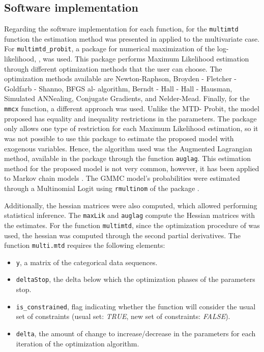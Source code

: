 \subsection{Software implementation}\label{software-implementation}

Regarding the software implementation for each function, for the \texttt{multimtd} function the estimation method was presented in \citet{Berchtold2001} applied to the multivariate case. For \texttt{multimtd\_probit}, a package for numerical maximization of the log-likelihood,  \citep{maxLik}, was used. This package performs Maximum Likelihood estimation through different optimization methods that the user can choose. The optimization methods available are Newton-Raphson, Broyden - Fletcher - Goldfarb - Shanno, BFGS al- algorithm, Berndt - Hall - Hall - Hausman, Simulated ANNealing, Conjugate Gradients, and Nelder-Mead. Finally, for the \texttt{mmcx} function, a different approach was used. Unlike the MTD- Probit, the model proposed has equality and inequality restrictions in the parameters. The  \citep{maxLik} package only allows one type of restriction for each Maximum Likelihood estimation, so it was not possible to use this package to estimate the proposed model with exogenous variables. Hence, the algorithm used was the Augmented Lagrangian method, available in the  \citep{alabama} package through the function \texttt{auglag}. This estimation method for the proposed model is not very common, however, it has been applied to Markov chain models \citep{Rajarshi2013}. The GMMC model's probabilities were estimated through a Multinomial Logit using \texttt{rmultinom} of the  package \citep{nnet}.

Additionally, the hessian matrices were also computed, which allowed performing statistical inference. The \texttt{maxLik} and \texttt{auglag} compute the Hessian matrices with the estimates. For the function \texttt{multimtd}, since the optimization procedure of \citet{Berchtold2001} was used, the hessian was computed through the second partial derivatives. The function \texttt{multi.mtd} requires the following elements:

\begin{itemize}
\item
  \texttt{y}, a matrix of the categorical data sequences.
\item
  \texttt{deltaStop}, the delta below which the optimization phases of the parameters stop.
\item
  \texttt{is\_constrained}, flag indicating whether the function will consider the usual set of constraints (usual set: \textit{TRUE}, new set of constraints: \textit{FALSE}).
\item
  \texttt{delta}, the amount of change to increase/decrease in the parameters for each iteration of the optimization algorithm.
\end{itemize}

